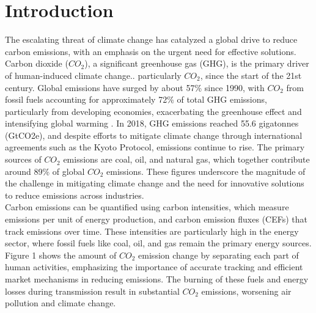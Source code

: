 \documentclass[preprint,12pt]{elsarticle}
\begin{document}

\section{Introduction}
\label{sec:sample1}


The escalating threat of climate change has catalyzed a global drive to reduce carbon emissions, with an emphasis on the urgent need for effective solutions. Carbon dioxide ($CO_2$), a significant greenhouse gas (GHG), is the primary driver of human-induced climate change.. particularly $CO_2$, since the start of the 21st century. Global emissions have surged by about 57\% since 1990, with $CO_2$ from fossil fuels accounting for approximately 72\% of total GHG emissions, particularly from developing economies, exacerbating the greenhouse effect and intensifying global warming \citep{jawalkar2024carbon}. In 2018, GHG emissions reached 55.6 gigatonnes (GtCO2e), and despite efforts to mitigate climate change through international agreements such as the Kyoto Protocol, emissions continue to rise. The primary sources of $CO_2$ emissions are coal, oil, and natural gas, which together contribute around 89\% of global $CO_2$ emissions. These figures underscore the magnitude of the challenge in mitigating climate change and the need for innovative solutions to reduce emissions across industries.\\
Carbon emissions can be quantified using carbon intensities, which measure emissions per unit of energy production, and carbon emission fluxes (CEFs) that track emissions over time. These intensities are particularly high in the energy sector, where fossil fuels like coal, oil, and gas remain the primary energy sources. Figure 1 shows the amount of $CO_2$ emission change by separating each part of human activities, emphasizing the importance of accurate tracking and efficient market mechanisms in reducing emissions.  The burning of these fuels and energy losses during transmission result in substantial $CO_2$ emissions, worsening air pollution and climate change.
\end{document}

